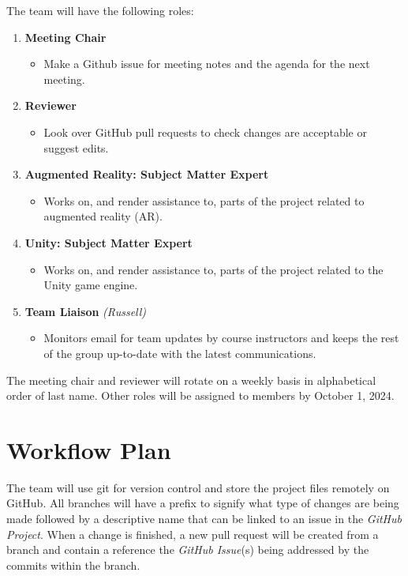 \documentclass{article}
\begin{document}
The team will have the following roles:
\begin{enumerate}
    \item \textbf{Meeting Chair}
    \begin{itemize}
        \item Make a Github issue for meeting notes and the agenda for the next meeting.
    \end{itemize}
    \item \textbf{Reviewer}
    \begin{itemize}
        \item Look over GitHub pull requests to check changes are acceptable or suggest edits.
    \end{itemize}
    \item \textbf{Augmented Reality: Subject Matter Expert}
    \begin{itemize}
        \item Works on, and render assistance to, parts of the project related to augmented reality (AR).
    \end{itemize}
    \item \textbf{Unity: Subject Matter Expert}
    \begin{itemize}
        \item Works on, and render assistance to, parts of the project related to the Unity game engine.
    \end{itemize}
    \item \textbf{Team Liaison} \textit{(Russell)}
    \begin{itemize}
        \item Monitors email for team updates by course instructors and keeps the rest of the group up-to-date with the latest communications.
    \end{itemize}
\end{enumerate}

The meeting chair and reviewer will rotate on a weekly basis in alphabetical order of last name. Other roles will be assigned to members by October 1, 2024.

\pagebreak

\section{Workflow Plan} \label{workflow_plan}

The team will use git for version control and store the project files remotely on GitHub. All branches will have a prefix to signify what type of changes are being made followed by a descriptive name that can be linked to an issue in the \textit{GitHub Project}. When a change is finished, a new pull request will be created from a branch and contain a reference the \textit{GitHub Issue}(s) being addressed by the commits within the branch.\\
\end{document}
